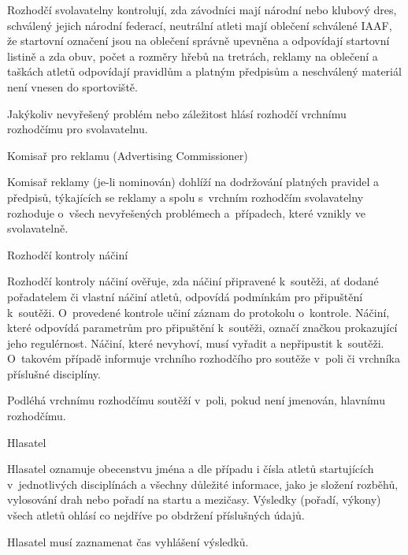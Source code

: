 Rozhodčí svolavatelny kontrolují, zda závodníci mají národní nebo klubový dres, schválený jejich národní federací, neutrální atleti mají oblečení schválené IAAF, že startovní označení jsou na oblečení správně upevněna a odpovídají startovní listině a zda obuv, počet a rozměry hřebů na tretrách, reklamy na oblečení a taškách atletů odpovídají pravidlům a platným předpisům a neschválený materiál není vnesen do sportoviště.

Jakýkoliv nevyřešený problém nebo záležitost hlásí rozhodčí vrchnímu rozhodčímu pro svolavatelnu.

\secc Komisař pro reklamu (Advertising Commissioner)

Komisař reklamy (je-li nominován) dohlíží na dodržování platných pravidel a předpisů, týkajících se reklamy a spolu s~vrchním rozhodčím svolavatelny rozhoduje o~všech nevyřešených problémech a~případech, které vznikly ve svolavatelně.



\secc Rozhodčí kontroly náčiní

Rozhodčí kontroly náčiní ověřuje, zda náčiní připravené k~soutěži, ať dodané pořadatelem či vlastní náčiní atletů, odpovídá podmínkám pro připuštění k~soutěži.
O~provedené kontrole učiní záznam do protokolu o~kontrole.
Náčiní, které odpovídá parametrům pro připuštění k~soutěži, označí značkou prokazující jeho regulérnost.
Náčiní, které nevyhoví, musí vyřadit a nepřipustit k~soutěži.
O~takovém případě informuje vrchního rozhodčího pro soutěže v~poli či vrchníka příslušné disciplíny.

Podléhá vrchnímu rozhodčímu soutěží v~poli, pokud není jmenován, hlavnímu rozhodčímu.

\secc Hlasatel

Hlasatel oznamuje obecenstvu jména a dle případu i čísla atletů startujících v~jednotlivých disciplínách a všechny důležité informace, jako je složení rozběhů, vylosování drah nebo pořadí na startu a mezičasy.
Výsledky (pořadí, výkony) všech atletů ohlásí co nejdříve po obdržení příslušných údajů.

Hlasatel musí zaznamenat čas vyhlášení výsledků.

\endinput